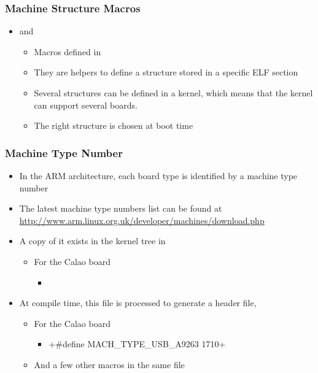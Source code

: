 \begin{frame}
  \frametitle{Machine Structure Macros}
  \begin{itemize}
  \item {} and 
    \begin{itemize}
    \item Macros defined in 
    \item They are helpers to define a 
      structure stored in a specific ELF section
    \item Several  structures can be defined in a
      kernel, which means that the kernel can support several boards.
    \item The right structure is chosen at boot time
    \end{itemize}
  \end{itemize}
\end{frame}

\begin{frame}[fragile]
  \frametitle{Machine Type Number}
  \begin{itemize}
  \item In the ARM architecture, each board type is identified by a
    machine type number
  \item The latest machine type numbers list can be found at
    \url{http://www.arm.linux.org.uk/developer/machines/download.php}
  \item A copy of it exists in the kernel tree in
    \begin{itemize}
    \item For the Calao board
      \begin{itemize}
      \item {}
      \end{itemize}
    \end{itemize}
  \item At compile time, this file is processed to generate a header
    file, 
    \begin{itemize}
    \item For the Calao board
      \begin{itemize}
      \item {}+#define MACH_TYPE_USB_A9263 1710+
      \end{itemize}
    \item And a few other macros in the same file
    \end{itemize}
  \end{itemize}
\end{frame}

